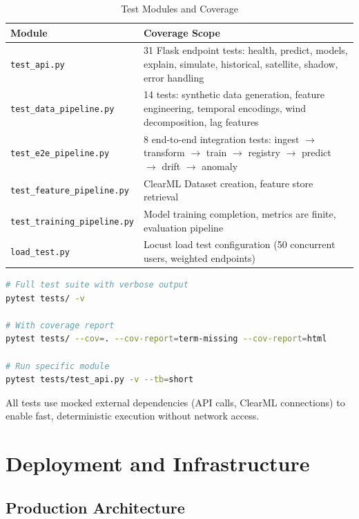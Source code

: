 \documentclass[12pt, a4paper, oneside]{article}
\begin{document}
\begin{table}[H]
\centering
\caption{Test Modules and Coverage}
\label{tab:tests}
\begin{tabularx}{\textwidth}{l X}
\toprule
\textbf{Module} & \textbf{Coverage Scope} \\
\midrule
\texttt{test\_api.py} & 31 Flask endpoint tests: health, predict, models, explain, simulate, historical, satellite, shadow, error handling \\
\texttt{test\_data\_pipeline.py} & 14 tests: synthetic data generation, feature engineering, temporal encodings, wind decomposition, lag features \\
\texttt{test\_e2e\_pipeline.py} & 8 end-to-end integration tests: ingest $\rightarrow$ transform $\rightarrow$ train $\rightarrow$ registry $\rightarrow$ predict $\rightarrow$ drift $\rightarrow$ anomaly \\
\texttt{test\_feature\_pipeline.py} & ClearML Dataset creation, feature store retrieval \\
\texttt{test\_training\_pipeline.py} & Model training completion, metrics are finite, evaluation pipeline \\
\texttt{load\_test.py} & Locust load test configuration (50 concurrent users, weighted endpoints) \\
\bottomrule
\end{tabularx}
\end{table}

\begin{lstlisting}[language=bash, caption={Running the test suite}]
# Full test suite with verbose output
pytest tests/ -v

# With coverage report
pytest tests/ --cov=. --cov-report=term-missing --cov-report=html

# Run specific module
pytest tests/test_api.py -v --tb=short
\end{lstlisting}

All tests use mocked external dependencies (API calls, ClearML connections) to enable fast, deterministic execution without network access.

\section{Deployment and Infrastructure}

\subsection{Production Architecture}
\end{document}
